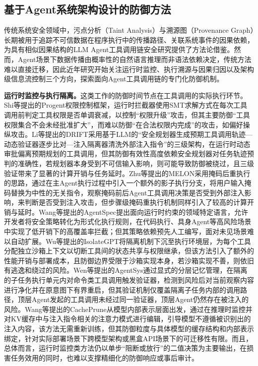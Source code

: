 \subsection{基于Agent系统架构设计的防御方法}

传统系统安全领域中，污点分析（Taint Analysis）与溯源图（Provenance Graph）长期被用于追踪不可信数据在程序执行中的传播路径、关联系统事件的因果依赖\cite{zipperle2022provenance}，为具有相似因果结构的LLM Agent工具调用链安全研究提供了方法论借鉴。然而，Agent场景下数据传播由概率性的自然语言推理而非语法依赖决定，传统方法难以直接迁移，因此近年研究开始关注运行时监控、执行溯源与因果归因以及架构级信息流控制三个方向，探索面向Agent工具调用链的专门化防御机制。

\textbf{运行时监控与执行隔离。}这类工作的防御时间节点在工具调用的实际执行环节。Shi等\cite{shi2025progent}提出的Progent权限控制框架，运行时拦截器使用SMT求解方式在每次工具调用前判定工具权限是否单调衰减，以控制“权限升级”攻击，但其主要防御“工具权限集合不会未经批准扩大”，而难以防御“在合法权限内完成”的攻击，如偏好操纵攻击。Li等\cite{li2025drift}提出的DRIFT采用基于LLM的“安全规划器生成预期工具调用轨迹—动态验证器逐步比对—注入隔离器清洗外部注入指令”的三级架构，在运行时动态审批偏离预期规划的工具调用，但其防御有效性高度依赖安全规划器对任务轨迹预判的准确性，若规划器本身受到不可信输入影响，则可能导致防御被绕过，且三级验证带来了显著的计算开销与任务延时。Zhu等\cite{zhu2025melon}提出的MELON采用掩码后重执行的思路，通过在主Agent执行过程中引入一个额外的影子执行分支，将用户输入掩码替换为中性的无关指令，观察掩码前后Agent工具调用决策是否受到外部注入影响，来判断是否受到注入攻击，但步骤级掩码重执行机制同样引入了较高的计算开销与延时。Wang等\cite{wang2025agentspec}提出的AgentSpec提出面向运行时约束的领域特定语言，允许开发者将安全策略转化为形式化执行规则，在代码执行、具身Agent等高风险场景中实现了低开销下的高覆盖率拦截；但其策略依赖预先人工编写，面对未见场景难以自动扩展。Wu等\cite{wu2025isolategpt}提出的IsolateGPT将隔离机制下沉至执行环境层，为每个工具分配独立沙箱上下文以切断工具间的状态共享与权限继承，但该方法引入了额外的性能开销与部署成本，且防御边界受限于沙箱实现本身，若沙箱实现不善，则依旧有逃逸和绕过的风险。Wen等\cite{wen2026agentsys}提出的AgentSys通过显式的分层记忆管理，在隔离的子任务执行单元内对命令类工具调用触发验证器，检测到风险后对当前观察内容进行净化并在原意图下有界重启，但其验证机制仅覆盖隔离子任务内部的调用路径，顶层Agent发起的工具调用未经过同一验证器，顶层Agent仍然存在被注入的风险。Wang等\cite{wang2025cacheprune}提出的CachePrune从模型内部表示层面出发，通过在推理时监控并对KV缓存中与注入指令相关的注意力模式进行编辑，引导模型不遵循被识别出的注入内容，该方法无需重新训练，但其防御粒度与具体模型的缓存结构和内部表示绑定，针对实际部署场景下跨模型架构或黑盒API场景下的可迁移性有限。而且，总体而言，运行时监控类方法仍以单步“阻断或放行”的二值决策为主要输出，在损害任务效用的同时，也难以支撑精细化的防御响应或事后审计。

